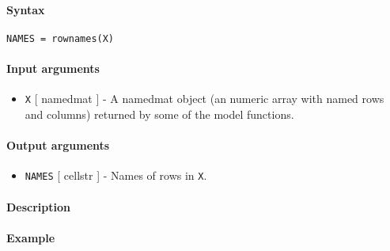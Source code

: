 


	\paragraph{Syntax}\label{syntax}

\begin{verbatim}
NAMES = rownames(X)
\end{verbatim}

\paragraph{Input arguments}\label{input-arguments}

\begin{itemize}
\itemsep1pt\parskip0pt
\item
  \texttt{X} {[} namedmat {]} - A namedmat object (an numeric array with
  named rows and columns) returned by some of the model functions.
\end{itemize}

\paragraph{Output arguments}\label{output-arguments}

\begin{itemize}
\itemsep1pt\parskip0pt
\item
  \texttt{NAMES} {[} cellstr {]} - Names of rows in \texttt{X}.
\end{itemize}

\paragraph{Description}\label{description}

\paragraph{Example}\label{example}


